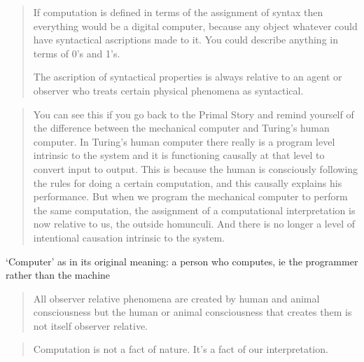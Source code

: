 \documentclass[11pt]{thesis} %
\begin{document}






\begin{quotation}
  If computation is defined in terms of the assignment of syntax then everything would be a digital computer, because any object whatever could have syntactical ascriptions made to it. You could describe anything in terms of 0's and 1's.

  The ascription of syntactical properties is always relative to an agent or observer who treats certain physical phenomena as syntactical.
\end{quotation}

\begin{quotation}
  You can see this if you go back to the Primal Story and remind yourself of the difference between the mechanical computer and Turing's human computer. In Turing's human computer there really is a program level intrinsic to the system and it is functioning causally at that level to convert input to output. This is because the human is consciously following the rules for doing a certain computation, and this causally explains his performance. But when we program the mechanical computer to perform the same computation, the assignment of a computational interpretation is now relative to us, the outside homunculi. And there is no longer a level of intentional causation intrinsic to the system.
\end{quotation}

`Computer' as in its original meaning: a person who computes, ie the programmer rather than the machine

\begin{quotation}
  All observer relative phenomena are created by human and animal consciousness but the human or animal consciousness that creates them is not itself observer relative.
\end{quotation}

\begin{quotation}
  Computation is not a fact of nature. It's a fact of our interpretation.
\end{quotation}
\end{document}
